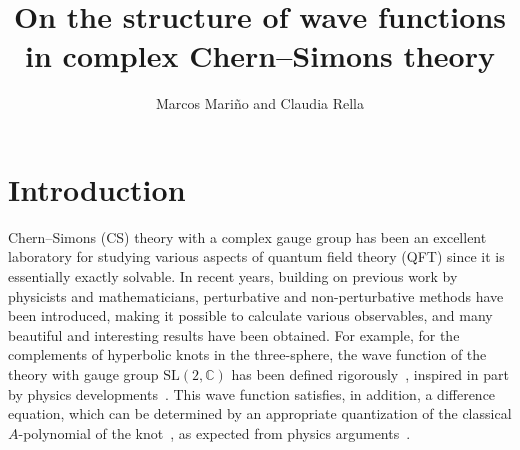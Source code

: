 \documentclass[a4paper,11pt]{article}
\title{\Huge{\boldmath On the structure of wave functions in complex Chern--Simons theory}}
\author{Marcos Mari\~no and Claudia Rella}
\affiliation{D\'epartement de Physique Th\'eorique and Section de Math\'ematiques\\ Universit\'e de Gen\`eve, CH-1211 Gen\`eve, Switzerland}
\theoremstyle{definition}
\def\IC{{\mathbb C}}
\newcommand{\sectiono}[1]{\section{#1}\setcounter{equation}{0}}
\begin{document}
\maketitle
\flushbottom


\sectiono{Introduction} \label{sec: intro}
Chern--Simons (CS) theory with a complex gauge group has been an excellent laboratory for studying various aspects of quantum field theory (QFT) since it is essentially exactly solvable. 
In recent years, building on previous work by physicists and mathematicians, perturbative and non-perturbative methods have been introduced, making it possible 
to calculate various observables, and many beautiful and interesting results have been obtained. 
For example, for the complements of hyperbolic knots in the three-sphere, the wave function of the theory with gauge group $\text{SL}(2,\IC)$ has been defined rigorously~\cite{ak}, inspired in part by physics developments~\cite{hikami07, dglz}. 
This wave function satisfies, in addition, a difference equation, which can be determined by an appropriate quantization of the classical $A$-polynomial of the knot~\cite{stavros-aj}, as expected from physics arguments~\cite{gukov}. 
\end{document}
